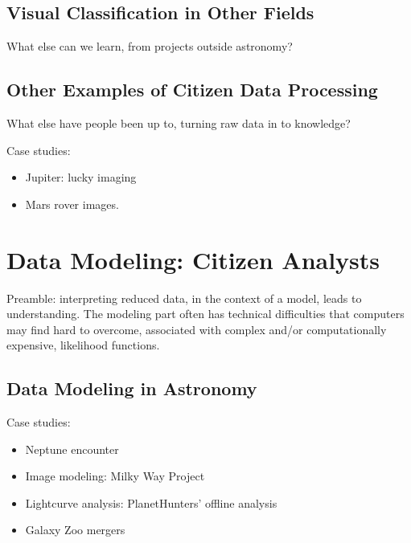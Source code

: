 \documentclass{ar2e}
\begin{document}

\subsection{Visual Classification in Other Fields}
\label{sec:class:non-astro}

What else can we learn, from projects outside astronomy?



\subsection{Other Examples of Citizen Data Processing}
\label{sec:class:non-sensory}

What else have people been up to, turning raw data in to knowledge?

Case studies:
\begin{itemize}
\item Jupiter: lucky imaging
\item Mars rover images.
\end{itemize}


\section{Data Modeling: Citizen Analysts}
\label{sec:model}

Preamble: interpreting reduced data, in the context of a model, leads to
understanding. The modeling part often has technical difficulties that computers
may find hard to overcome, associated with complex and/or computationally
expensive, likelihood functions.



\subsection{Data Modeling in Astronomy}
\label{sec:model:astro}

Case studies:
\begin{itemize}
\item Neptune encounter
\item Image modeling: Milky Way Project
\item Lightcurve analysis: PlanetHunters' offline analysis
\item Galaxy Zoo mergers
\end{itemize}
\end{document}
